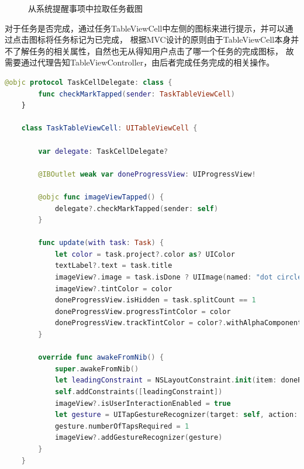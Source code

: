 \begin{figure}[!htbp]
	\centering
	\caption{从系统提醒事项中拉取任务截图}
	\label{fig:inbox_no_split}
\end{figure}

对于任务是否完成，通过任务TableViewCell中左侧的图标来进行提示，并可以通过点击图标将任务标记为已完成，
根据MVC设计的原则由于TableViewCell本身并不了解任务的相关属性，自然也无从得知用户点击了哪一个任务的完成图标\parencite{ios2017program}，
故需要通过代理告知TableViewController，由后者完成任务完成的相关操作。

\begin{lstlisting}[language={Swift}, caption={TaskTableViewCell}]
	@objc protocol TaskCellDelegate: class {
		func checkMarkTapped(sender: TaskTableViewCell)
	}

	class TaskTableViewCell: UITableViewCell {
		
		var delegate: TaskCellDelegate?
		
		@IBOutlet weak var doneProgressView: UIProgressView!
		
		@objc func imageViewTapped() {
			delegate?.checkMarkTapped(sender: self)
		}
		
		func update(with task: Task) {
			let color = task.project?.color as? UIColor
			textLabel?.text = task.title
			imageView?.image = task.isDone ? UIImage(named: "dot circle") : UIImage(named: "circle")
			imageView?.tintColor = color
			doneProgressView.isHidden = task.splitCount == 1
			doneProgressView.progressTintColor = color
			doneProgressView.trackTintColor = color?.withAlphaComponent(0.1)
		}
		
		override func awakeFromNib() {
			super.awakeFromNib()
			let leadingConstraint = NSLayoutConstraint.init(item: doneProgressView!, attribute: .leading, relatedBy: .equal, toItem: textLabel, attribute: .leading, multiplier: 1.0, constant: 0)
			self.addConstraints([leadingConstraint])
			imageView?.isUserInteractionEnabled = true
			let gesture = UITapGestureRecognizer(target: self, action: #selector(imageViewTapped))
			gesture.numberOfTapsRequired = 1
			imageView?.addGestureRecognizer(gesture)
		}
	}
\end{lstlisting}

